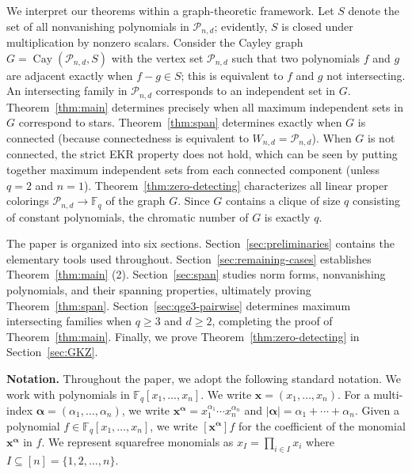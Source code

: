 \documentclass[12pt,reqno]{amsart}
\theoremstyle{definition}
\newcommand{\F}{\mathbb{F}}
\newcommand{\cP}{\mathcal P}
\begin{document}
We interpret our theorems within a graph-theoretic framework. Let $S$ denote the set of all nonvanishing polynomials in $\cP_{n,d}$; evidently, $S$ is closed under multiplication by nonzero scalars. Consider the Cayley graph $G=\operatorname{Cay}(\cP_{n,d}, S)$ with the vertex set $\cP_{n,d}$ such that two polynomials $f$ and $g$ are adjacent exactly when $f-g\in S$; this is equivalent to $f$ and $g$ not intersecting. An intersecting family in $\cP_{n,d}$ corresponds to an independent set in $G$. Theorem~\ref{thm:main} determines precisely when all maximum
independent sets in $G$ correspond to stars. Theorem~\ref{thm:span} determines exactly when $G$ is connected (because connectedness is equivalent to $W_{n,d}=\cP_{n,d}$). When $G$ is not connected, the strict EKR property does not hold, which can be seen by putting together maximum independent sets from each connected component (unless $q=2$ and $n=1$). Theorem~\ref{thm:zero-detecting} characterizes all linear proper colorings $\cP_{n,d}\to \F_q$ of the graph $G$. Since $G$ contains a clique of size $q$ consisting of constant polynomials, the chromatic number of $G$ is exactly $q$. 

\medskip 

The paper is organized into six sections. Section~\ref{sec:preliminaries}
contains the elementary tools used throughout. Section~\ref{sec:remaining-cases} establishes Theorem~\ref{thm:main} (2). Section~\ref{sec:span} studies norm forms, nonvanishing polynomials, and their spanning properties, ultimately proving Theorem~\ref{thm:span}. Section~\ref{sec:qge3-pairwise} determines maximum intersecting families when $q\geq 3$ and $d\geq 2$, completing the proof of Theorem~\ref{thm:main}. Finally, we prove Theorem~\ref{thm:zero-detecting} in Section~\ref{sec:GKZ}.

\medskip

\textbf{Notation.}  Throughout the paper, we adopt the following standard notation. We work with polynomials in $\F_q[x_1,\ldots, x_n]$. We write $\mathbf{x}=(x_1,\ldots, x_n)$. For a multi-index $\boldsymbol{\alpha}=(\alpha_1, \ldots, \alpha_n)$, we write $\mathbf{x}^{\boldsymbol{\alpha}}=x_1^{\alpha_1} \cdots x_n^{\alpha_n}$ and $|\boldsymbol{\alpha}|=\alpha_1+\cdots+\alpha_n$. Given a polynomial $f\in \F_q[x_1,\ldots, x_n]$, we write $[\mathbf{x}^{\boldsymbol{\alpha}}]f$ for the coefficient of the monomial $\mathbf{x}^{\boldsymbol{\alpha}}$ in $f$. We represent squarefree monomials as $x_I=\prod_{i\in I} x_i$ where $I\subseteq [n]=\{1,2,\ldots, n\}$.
\end{document}
